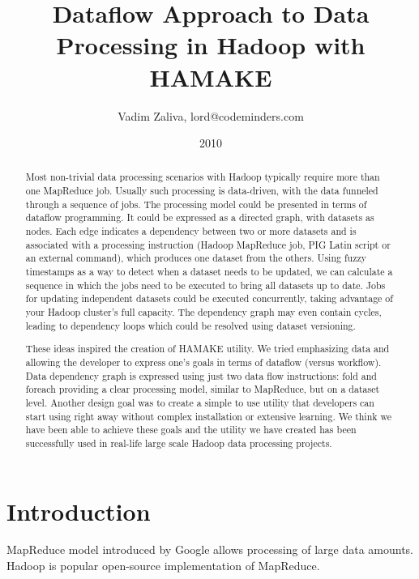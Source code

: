 \documentclass{article}
\author{Vadim Zaliva, lord@codeminders.com}
\date{2010}
\title{Dataflow Approach to Data Processing in Hadoop with HAMAKE}
\begin{document}
\lstset{language=XML,basicstyle=\tiny,markfirstintag=true,numbers=left, numberstyle=\tiny}

\maketitle

\begin{abstract}
  Most non-trivial data processing scenarios with Hadoop typically
  require more than one MapReduce job. Usually such processing is
  data-driven, with the data funneled through a sequence of jobs. The
  processing model could be presented in terms of dataflow
  programming. It could be expressed as a directed graph, with
  datasets as nodes. Each edge indicates a dependency between two or
  more datasets and is associated with a processing instruction
  (Hadoop MapReduce job, PIG Latin script or an external command),
  which produces one dataset from the others. Using fuzzy timestamps
  as a way to detect when a dataset needs to be updated, we can
  calculate a sequence in which the jobs need to be executed to bring
  all datasets up to date. Jobs for updating independent datasets
  could be executed concurrently, taking advantage of your Hadoop
  cluster's full capacity. The dependency graph may even contain
  cycles, leading to dependency loops which could be resolved using
  dataset versioning.

  These ideas inspired the creation of HAMAKE utility. We tried
  emphasizing data and allowing the developer to express one's goals
  in terms of dataflow (versus workflow). Data dependency graph is
  expressed using just two data flow instructions: fold and foreach
  providing a clear processing model, similar to MapReduce, but on a
  dataset level. Another design goal was to create a simple to use
  utility that developers can start using right away without complex
  installation or extensive learning. We think we have been able to
  achieve these goals and the utility we have created has been
  successfully used in real-life large scale Hadoop data processing
  projects. 
\end{abstract}

\section{Introduction}

MapReduce model introduced by Google\cite{dean2008map} allows
processing of large data amounts. Hadoop\cite{bialecki2005hadoop} is
popular open-source implementation of MapReduce.
\end{document}
